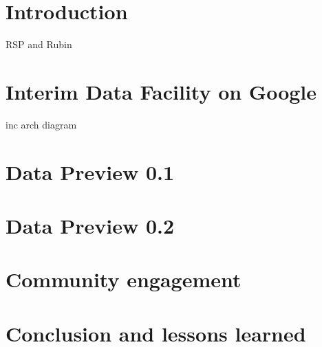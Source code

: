 \section{Introduction}
RSP and Rubin


\section{Interim Data Facility on Google }
inc arch diagram

\section{Data Preview 0.1}


\section{Data Preview 0.2}

\section{Community engagement }

\section{Conclusion and lessons learned}



